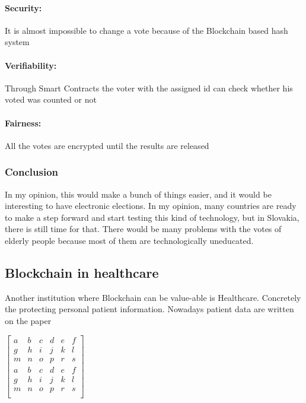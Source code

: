 \documentclass[10pt,english,a4paper]{article}
\begin{document}
\paragraph{Security:}
It is almost impossible to change a vote because of the Blockchain based hash system
\cite{Alvi:E-voting}
\paragraph{Verifiability:}
Through Smart Contracts the voter with the assigned id can check whether his voted was counted or not
\cite{Alvi:E-voting}
\paragraph{Fairness:}
All the votes are encrypted until the results are released
\cite{Alvi:E-voting}



\subsubsection{Conclusion}
In my opinion, this would make a bunch of things easier, and it would be interesting to have electronic elections. In my opinion, many countries are ready to make a step forward and start testing this kind of technology, but in Slovakia, there is still time for that. There would be many problems with the votes of elderly people because most of them are technologically uneducated.

\subsection{Blockchain in healthcare}
Another institution where Blockchain can be value-able is Healthcare. Concretely the protecting personal patient information. Nowadays patient data are written on the paper 
\cite{Ramar:Healthcare}

 
$\begin{bmatrix}
  a & b & c & d & e &f\\
  g & h & i & j & k &l \\
  m & n & o & p & r &s\\
   a & b & c & d & e &f\\
  g & h & i & j & k &l \\
  m & n & o & p & r &s\\
  

  
\end{bmatrix}$



\newpage


\end{document}
